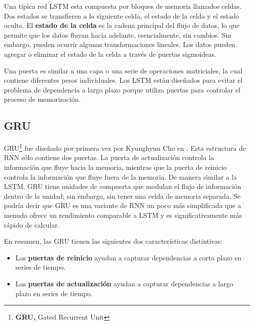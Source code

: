 Una t\'{i}pica red LSTM esta compuesta por bloques de memoria llamados celdas. Dos estados se transfieren a la siguiente celda, el estado de la celda y el estado oculto. El \textbf{estado de la celda} es la cadena principal del flujo de datos, lo que permite que los datos fluyan hacia adelante, esencialmente, sin cambios. Sin embargo, pueden ocurrir algunas transformaciones lineales. Los datos pueden agregar o eliminar el estado de la celda a trav\'{e}s de puertas sigmoideas.

\vspace{5mm} %

Una puerta es similar a una capa o una serie de operaciones matriciales, la cual contiene diferentes pesos individuales. Los LSTM est\'{a}n dise\~{n}ados para evitar el problema de dependencia a largo plazo porque utiliza puertas para controlar el proceso de memorizaci\'{o}n. 

\subsection{GRU}

GRU\footnote{\textbf{GRU, }Gated Recurrent Unit} fue dise\~{n}ado por primera vez por Kyunghyun Cho en \citeyear{Reference55}. Esta estructura de RNN s\'{o}lo contiene dos puertas. La puerta de actualizaci\'{o}n controla la informaci\'{o}n que fluye hacia la memoria, mientras que la puerta de reinicio controla la informaci\'{o}n que fluye fuera de la memoria. De manera similar a la LSTM, GRU tiene unidades de compuerta que modulan el flujo de informaci\'{o}n dentro de la unidad; sin embargo, sin tener una celda de memoria separada. Se podr\'{i}a decir que GRU es una variante de RNN un poco m\'{a}s simplificada que a menudo ofrece un rendimiento comparable a LSTM y es significativamente m\'{a}s r\'{a}pido de calcular.

\vspace{5mm} %

En resumen, las GRU tienen las siguientes dos caracter\'{i}sticas distintivas:

\begin{itemize}
\item Las \textbf{puertas de reinicio} ayudan a capturar dependencias a corto plazo en series de tiempo.
\item Las \textbf{puertas de actualizaci\'{o}n} ayudan a capturar dependencias a largo plazo en series de tiempo.
\end{itemize}

